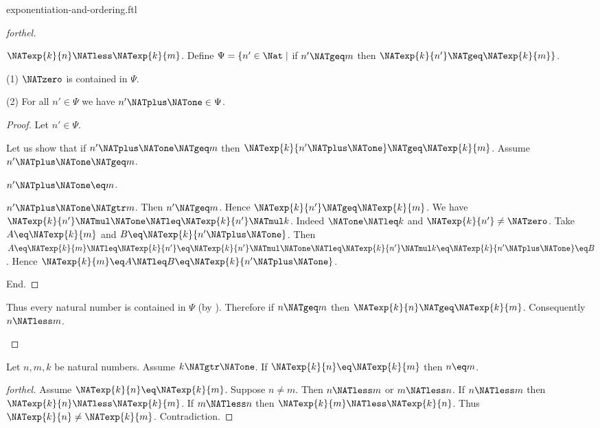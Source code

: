 \documentclass{naproche-library}
\begin{document}
\begin{smodule}[title=Exponentiation and Ordering]{exponentiation-and-ordering.ftl}
\begin{proof}[forthel]
  \begin{case}{$\NATexp{k}{n} \NATless \NATexp{k}{m}$.}
    Define $\Psi = \{ n' \in \Nat \mid$ if $n' \NATgeq m$ then
    $\NATexp{k}{n'} \NATgeq \NATexp{k}{m} \}$.

    (1) $\NATzero$ is contained in $\Psi$.

    (2) For all $n' \in \Psi$ we have $n' \NATplus \NATone \in \Psi$.
    \begin{proof}
      Let $n' \in \Psi$.

      Let us show that if $n' \NATplus \NATone \NATgeq m$ then $\NATexp{k}{n' \NATplus \NATone} \NATgeq \NATexp{k}{m}$.
        Assume $n' \NATplus \NATone \NATgeq m$.

        \begin{case}{$n' \NATplus \NATone \eq m$.} \end{case}

        \begin{case}{$n' \NATplus \NATone \NATgtr m$.}
          Then $n' \NATgeq m$.
          Hence $\NATexp{k}{n'} \NATgeq \NATexp{k}{m}$.
          We have $\NATexp{k}{n'} \NATmul \NATone \NATleq \NATexp{k}{n'} \NATmul k$.
          Indeed $\NATone \NATleq k$ and $\NATexp{k}{n'} \neq \NATzero$.
          Take $A \eq \NATexp{k}{m}$ and $B \eq \NATexp{k}{n' \NATplus \NATone}$. %
          Then $A
            \eq \NATexp{k}{m}
            \NATleq \NATexp{k}{n'}
            \eq \NATexp{k}{n'} \NATmul \NATone
            \NATleq \NATexp{k}{n'} \NATmul k
            \eq \NATexp{k}{n' \NATplus \NATone}
            \eq B$.
          Hence $\NATexp{k}{m} \eq A \NATleq B \eq \NATexp{k}{n' \NATplus \NATone}$.
        \end{case}
      End.
    \end{proof}

    Thus every natural number is contained in $\Psi$ (by ).
    Therefore if $n \NATgeq m$ then $\NATexp{k}{n} \NATgeq \NATexp{k}{m}$.
    Consequently $n \NATless m$.
  \end{case}
\end{proof}

\begin{corollary}[forthel,id=ARITHMETIC_09_6780506905509888]
  Let $n, m, k$ be natural numbers.
  Assume $k \NATgtr \NATone$.
  If $\NATexp{k}{n} \eq \NATexp{k}{m}$ then $n \eq m$.
\end{corollary}
\begin{proof}[forthel]
  Assume $\NATexp{k}{n} \eq \NATexp{k}{m}$.
  Suppose $n \neq m$.
  Then $n \NATless m$ or $m \NATless n$.
  If $n \NATless m$ then $\NATexp{k}{n} \NATless \NATexp{k}{m}$.
  If $m \NATless n$ then $\NATexp{k}{m} \NATless \NATexp{k}{n}$.
  Thus $\NATexp{k}{n} \neq \NATexp{k}{m}$.
  Contradiction.
\end{proof}


\end{smodule}
\end{document}
